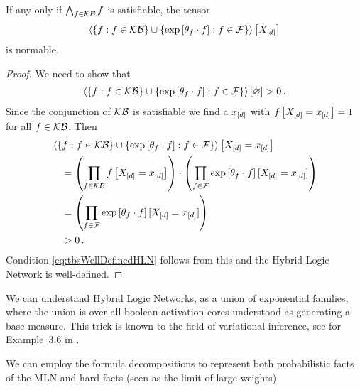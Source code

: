 \begin{theorem}
    If any only if $\bigwedge_{f\in\mathcal{KB}}f$ is satisfiable, the tensor
    \[  \left\langle 
        \{f : f\in\mathcal{KB}\} \cup \{\mathrm{exp}\left[\theta_{f}\cdot f\right] : f\in\mathcal{F}\}
    \right\rangle \left[ X_{[d]} \right] \]
    is normable.
\end{theorem}
\begin{proof}
    We need to show that
    \begin{align}
        \label{eq:tbsWellDefinedHLN}
        \left\langle \{f : f\in\mathcal{KB}\} \cup \{\mathrm{exp}\left[\theta_{f}\cdot f\right] : f\in\mathcal{F}\}\right\rangle \left[ \varnothing \right] > 0 \, .
    \end{align}
    Since the conjunction of $\mathcal{KB}$ is satisfiable we find a $x_{[d]}$ with $f\left[X_{[d]}=x_{[d]}\right]=1$ for all $f\in\mathcal{KB}$.
    Then
    \begin{align*}
        & \left\langle \{f : f\in\mathcal{KB}\} \cup \{\mathrm{exp}\left[\theta_{f}\cdot f\right] : f\in\mathcal{F}\}\right\rangle \left[ X_{[d]}=x_{[d]} \right] \\
        & \quad = \left( \prod_{f\in\mathcal{KB}}f\left[X_{[d]}=x_{[d]}\right] \right)
        \cdot \left( \prod_{f\in\mathcal{F}}\mathrm{exp}\left[\theta_{f}\cdot f\right][X_{[d]}=x_{[d]}] \right) \\
        & \quad =  \left( \prod_{f\in\mathcal{F}}\mathrm{exp}\left[\theta_{f}\cdot f\right][X_{[d]}=x_{[d]}] \right) \\
        & \quad > 0 \, .
    \end{align*}
    Condition \eqref{eq:tbsWellDefinedHLN} follows from this and the Hybrid Logic Network is well-defined.
\end{proof}

We can understand Hybrid Logic Networks, as a union of exponential families, where the union is over all boolean activation cores understood as generating a base measure.
This trick is known to the field of variational inference, see for Example~3.6 in \cite{wainwright_graphical_2008}.


We can employ the formula decompositions to represent both probabilistic facts of the MLN and hard facts (seen as the limit of large weights).

